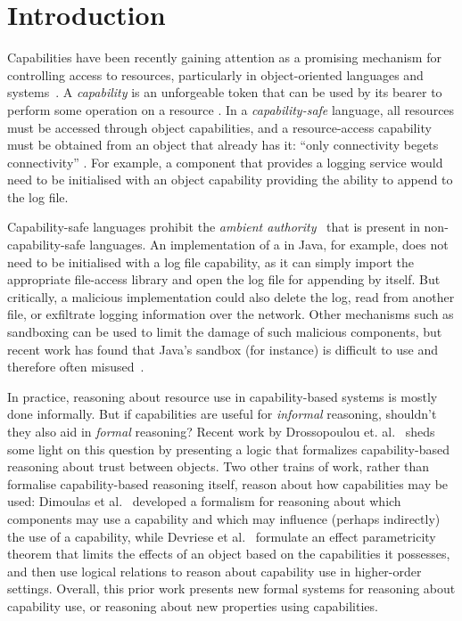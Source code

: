 \section{Introduction}

Capabilities have been recently gaining attention as a promising
mechanism for controlling access to resources, particularly in
object-oriented languages and
systems~\cite{miller03,drossopoulou07,dimoulas14,devriese16}.  A
\textit{capability} is an unforgeable token that can be used by its
bearer to perform some operation on a resource \cite{dennis66}.  In a
\textit{capability-safe} language, all resources must be accessed
through object capabilities, and a resource-access capability must be
obtained from an object that already has it: ``only connectivity
begets connectivity'' \cite{miller03}.  For example, a 
component that provides a logging service would need to be initialised
with an object capability providing the ability to append to the log
file.

Capability-safe languages prohibit the \textit{ambient
  authority}~\cite{miller06} that is present in non-capability-safe
languages. An implementation of a  in Java, for example,
does not need to be initialised with a log file capability, as it can simply
import the appropriate file-access library and open the log file for
appending by itself. But critically, a malicious implementation could also
delete the log, read from another file, or exfiltrate logging information
over the network.  Other mechanisms such as sandboxing can be used
to limit the damage of such malicious components, but recent work has
found that Java's sandbox (for instance) is difficult to use and
therefore often misused~\cite{coker15,maass16}.

In practice, reasoning about resource use in capability-based systems
is mostly done informally.
But if capabilities are useful for \textit{informal} reasoning,
shouldn't they also aid in \textit{formal} reasoning?  Recent work by
Drossopoulou et. al.~\cite{drossopoulou07} sheds some light on this question
by presenting a logic that 
formalizes capability-based reasoning about trust between
objects.  Two other trains of work, rather than
formalise capability-based reasoning itself, reason about how
capabilities may be used: Dimoulas et al.~\cite{dimoulas14} developed a formalism for
reasoning about which components may use a capability and which may
influence (perhaps indirectly) the use of a
capability, while  Devriese et al.~\cite{devriese16} formulate an effect
parametricity theorem that limits the effects of an object based on
the capabilities it possesses, and then use logical relations to
reason about capability use in higher-order settings.  Overall, this prior work presents new formal systems for reasoning
about capability use, or reasoning about new properties using
capabilities.

